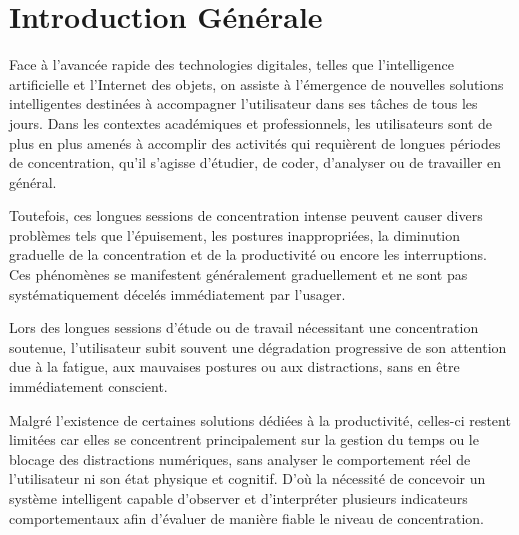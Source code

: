 \documentclass[12pt,a4paper]{report}
\begin{document}
\begin{acronym}
\end{acronym}

\tableofcontents
\clearpage


\chapter*{Introduction Générale}

Face à l'avancée rapide des technologies digitales, telles que l'intelligence artificielle et l'Internet des objets, on assiste à l'émergence de nouvelles solutions intelligentes destinées à accompagner l'utilisateur dans ses tâches de tous les jours. Dans les contextes académiques et professionnels, les utilisateurs sont de plus en plus amenés à accomplir des activités qui requièrent de longues périodes de concentration, qu'il s'agisse d'étudier, de coder, d'analyser ou de travailler en général.

Toutefois, ces longues sessions de concentration intense peuvent causer divers problèmes tels que l'épuisement, les postures inappropriées, la diminution graduelle de la concentration et de la productivité ou encore les interruptions. Ces phénomènes se manifestent généralement graduellement et ne sont pas systématiquement décelés immédiatement par l'usager.

Lors des longues sessions d'étude ou de travail nécessitant une concentration soutenue, l'utilisateur subit souvent une dégradation progressive de son attention due à la fatigue, aux mauvaises postures ou aux distractions, sans en être immédiatement conscient.

Malgré l'existence de certaines solutions dédiées à la productivité, celles-ci restent limitées car elles se concentrent principalement sur la gestion du temps ou le blocage des distractions numériques, sans analyser le comportement réel de l'utilisateur ni son état physique et cognitif. D'où la nécessité de concevoir un système intelligent capable d'observer et d'interpréter plusieurs indicateurs comportementaux afin d'évaluer de manière fiable le niveau de concentration.
\end{document}
